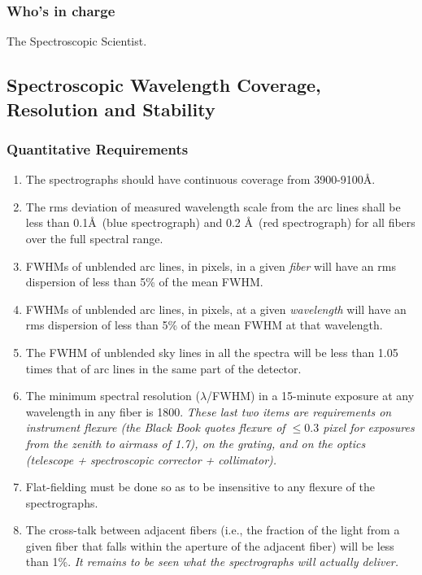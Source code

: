 \subsubsection{Who's in charge}
The Spectroscopic Scientist.

\subsection{Spectroscopic Wavelength Coverage, Resolution and Stability}

\subsubsection{Quantitative Requirements}
\begin{enumerate} 
\item The spectrographs should have continuous coverage from 3900-9100\AA.  
\item The rms deviation of measured wavelength scale from the arc lines shall be
less than 0.1\AA\ (blue spectrograph) and 0.2 \AA\ (red spectrograph) for all
fibers over the full spectral range.
\item FWHMs of unblended arc lines, in pixels, in a given {\em fiber}
will have an rms dispersion of less than 5\% of the mean FWHM.
\item FWHMs of unblended arc lines, in pixels, at a given {\em
wavelength} will have an rms dispersion of less than 5\% of the mean
FWHM at that wavelength.  
\item The FWHM of unblended sky lines in all the spectra will be less than 1.05 times
that of arc lines in the same part of the detector. 
\item The minimum spectral resolution ($\lambda$/FWHM) in a 15-minute
exposure at any wavelength in any fiber is 1800.
{\it These last two items are requirements on instrument flexure (the Black
Book quotes flexure of ${} \le 0.3$ pixel for exposures from the zenith to
airmass of 1.7), on the grating, and on the optics (telescope +
spectroscopic corrector + collimator).}
\item Flat-fielding must be done so as to be insensitive to any
flexure of the spectrographs. 
\item The cross-talk between adjacent fibers (i.e., the fraction of
the light from a given fiber that falls within the aperture of the
adjacent fiber) will be less than
1\%. {\it It remains to be seen what the spectrographs will actually deliver.}
\end{enumerate}

